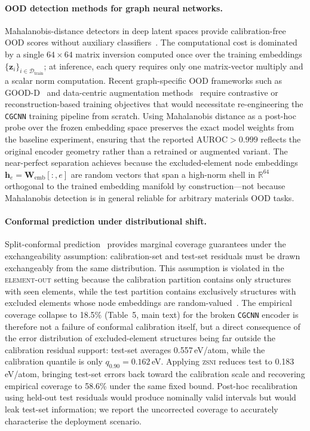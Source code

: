 \documentclass[preprint,12pt]{elsarticle}
\newcommand{\mae}{\text{MAE}}
\newcommand{\auroc}{\text{AUROC}}
\newcommand{\elout}{\textsc{element-out}}
\newcommand{\cgcnn}{\texttt{CGCNN}}
\newcommand{\zsni}{\textsc{zsni}}
\begin{document}
\paragraph{OOD detection methods for graph neural networks.}
Mahalanobis-distance detectors in deep latent spaces provide calibration-free
OOD scores without auxiliary classifiers~\cite{lee2018simple}. The computational
cost is dominated by a single $64 \times 64$ matrix inversion computed once
over the training embeddings $\{\bm{z}_i\}_{i \in \mathcal{D}_{\text{train}}}$;
at inference, each query requires only one matrix-vector multiply and a
scalar norm computation. Recent graph-specific OOD frameworks such as
GOOD-D~\cite{liu2023good} and data-centric augmentation methods~\cite{wu2023data}
require contrastive or reconstruction-based training objectives that would
necessitate re-engineering the \cgcnn{} training pipeline from scratch.
Using Mahalanobis distance as a post-hoc probe over the frozen embedding space
preserves the exact model weights from the baseline experiment, ensuring that
the reported $\auroc{} > 0.999$ reflects the original encoder geometry
rather than a retrained or augmented variant. The near-perfect separation
achieves because the excluded-element node embeddings
$\bm{h}_e = \bm{W}_{\text{emb}}[:,e]$ are random vectors that span a
high-norm shell in $\mathbb{R}^{64}$ orthogonal to the trained embedding
manifold by construction---not because Mahalanobis detection is in general
reliable for arbitrary materials OOD tasks.

\paragraph{Conformal prediction under distributional shift.}
Split-conformal prediction~\cite{papadopoulos2002inductive} provides marginal
coverage guarantees under the exchangeability assumption: calibration-set
and test-set residuals must be drawn exchangeably from the same distribution.
This assumption is violated in the \elout{} setting because the calibration
partition contains only structures with seen elements, while the test partition
contains exclusively structures with excluded elements whose node embeddings
are random-valued~\cite{barber2023conformal, tibshirani2019conformal}.
The empirical coverage collapse to 18.5\% (Table~5, main text) for the broken
\cgcnn{} encoder is therefore not a failure of conformal calibration itself,
but a direct consequence of the error distribution of excluded-element
structures being far outside the calibration residual support: test-set
\mae{} averages 0.557\,eV/atom, while the calibration quantile is only
$q_{0.90} = 0.162$\,eV. Applying \zsni{} reduces test \mae{} to
0.183\,eV/atom, bringing test-set errors back toward the calibration
scale and recovering empirical coverage to 58.6\% under the same fixed
bound. Post-hoc recalibration using held-out test residuals would produce
nominally valid intervals but would leak test-set information; we report
the uncorrected coverage to accurately characterise the deployment scenario.
\end{document}
